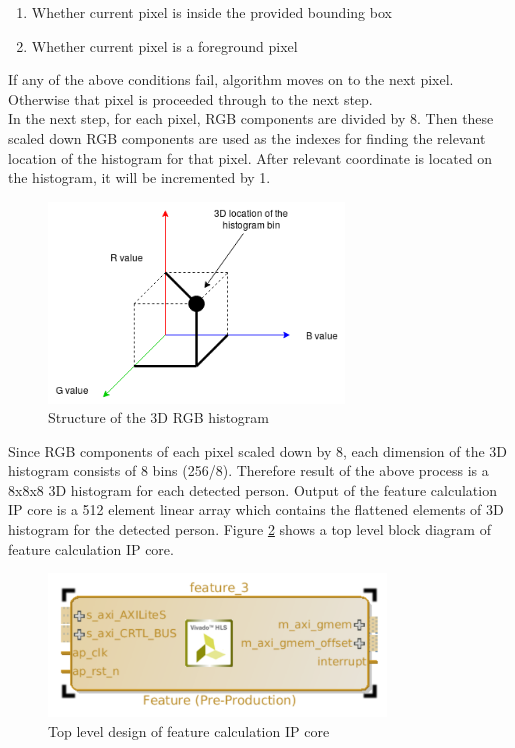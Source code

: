 \documentclass[12pt,a4paper]{report}
\begin{document}
\begin{enumerate}
\item Whether current pixel is inside the provided bounding box
\item Whether current pixel is a foreground pixel
\end{enumerate}
If any of the above conditions fail, algorithm moves on to the next pixel. Otherwise that pixel is proceeded through to the next step.\\
In the next step, for each pixel, RGB components are divided by 8. Then these scaled down RGB components are used as the indexes for finding the relevant location of the histogram for that pixel. After relevant coordinate is located on the histogram, it will be incremented by 1.
\begin{figure}[H]
\includegraphics[width=0.7\textwidth]{test.png}
\centering
\caption{Structure of the 3D RGB histogram}
\label{hist}
\end{figure}

Since RGB components of each pixel scaled down by 8, each dimension of the 3D histogram consists of 8 bins (256/8). Therefore result of the above process is a 8x8x8 3D histogram for each detected person. Output of the feature calculation IP core is a 512 element linear array which contains the flattened elements of 3D histogram for the detected person. Figure \ref{featureip} shows a top level block diagram of feature calculation IP core. 
\begin{figure}[H]
\includegraphics[width=0.8\textwidth]{featureip}
\centering
\caption{Top level design of feature calculation IP core}
\label{featureip}
\end{figure}
\end{document}
